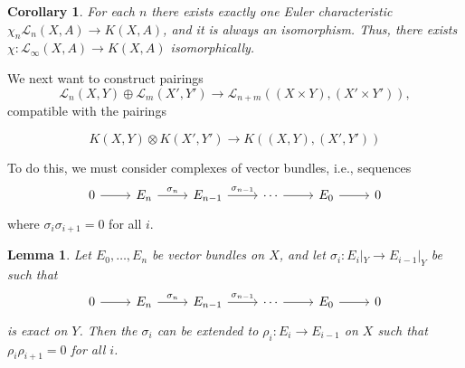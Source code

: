 \documentclass[leqno]{book}
\numberwithin{equation}{section}
\newtheorem{corollary}[theorem]{Corollary}
\newtheorem{lemma}[theorem]{Lemma}
\theoremstyle{definition}
\begin{document}
            \begin{corollary}
              For each $n$ there exists exactly one Euler characteristic $\chi_{n}\mathcal{L}_{n}(X,A)\to K(X,A)$, and it is always an isomorphism. Thus, there exists $\chi:\mathcal{L}_{\infty}(X,A)\to K(X,A)$ isomorphically.
            \end{corollary}

            We next want to construct pairings
            \begin{equation*}
              \mathcal{L}_{n}(X,Y)\oplus \mathcal{L}_{m}(X',Y')\to \mathcal{L}_{n+m}((X\times Y),(X'\times Y')),
            \end{equation*}
            compatible with the pairings

            \begin{equation*}
              K(X,Y)\otimes K(X',Y')\to K((X,Y),(X',Y'))
            \end{equation*}

            To do this, we must consider complexes of vector bundles, i.e., sequences 
            \begin{equation*}
              \begin{tikzcd}
                0\arrow[r] & E_{n}\arrow[r, "\sigma_{n}"] & E_{n-1}\arrow[r, "\sigma_{n-1}"] & \cdots \arrow[r] & E_0 \arrow[r] &0
              \end{tikzcd}
            \end{equation*}
            where $\sigma_{i}\sigma_{i+1}=0$ for all $i$.

            \begin{lemma}
              Let $E_0, \ldots ,E_{n}$ be vector bundles on $X$, and let $\sigma_{i}:E_{i}|_{Y}\to E_{i-1}|_{Y}$ be such that
              \begin{equation*}
                \begin{tikzcd}
                  0\arrow[r] & E_{n}\arrow[r, "\sigma_{n}"] & E_{n-1}\arrow[r, "\sigma_{n-1}"] & \cdots \arrow[r] & E_0 \arrow[r] &0
                \end{tikzcd}
              \end{equation*}
              is exact on $Y$. Then the $\sigma_{i}$ can be extended to $\rho_{i}:E_{i}\to E_{i-1}$ on $X$ such that $\rho_{i}\rho_{i+1}=0$ for all $i$.
            \end{lemma}
\end{document}
